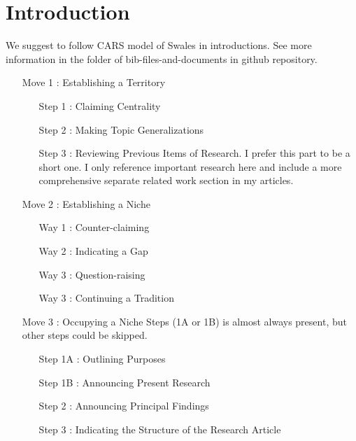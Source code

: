 \section{Introduction}
\label{section-introduction}

We suggest to follow CARS model of Swales \cite{Swales2014Create} in introductions.
See more information in the folder of bib-files-and-documents in github repository.

\begin{enumerate}
	\item[Move 1]: Establishing a Territory
	\begin{enumerate}
		\item[Step 1]: Claiming Centrality
		\item[Step 2]: Making Topic Generalizations
		\item[Step 3]: Reviewing Previous Items of Research. I prefer this part to be a short one. I only reference important research here and include a more comprehensive separate related work section in my articles.

	\end{enumerate}

	\item[Move 2]: Establishing a Niche
	\begin{enumerate}
		\item[Way 1]: Counter-claiming
		\item[Way 2]: Indicating a Gap
		\item[Way 3]: Question-raising
		\item[Way 3]: Continuing a Tradition


	\end{enumerate}
	
	\item[Move 3]:  Occupying a Niche
	 Steps (1A or 1B) is almost always present, but other steps could be skipped.

	\begin{enumerate}
		\item[Step 1A]: Outlining Purposes
		\item[Step 1B]: Announcing Present Research
		\item[Step 2]: Announcing Principal Findings
		\item[Step 3]: Indicating the Structure of the Research Article

	\end{enumerate}

\end{enumerate}

